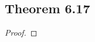 \documentclass[../../main.tex]{subfiles}
\begin{document}
\subsection{Theorem 6.17}
\begin{wts}

\end{wts}
\begin{proof}

\end{proof}
\end{document}

